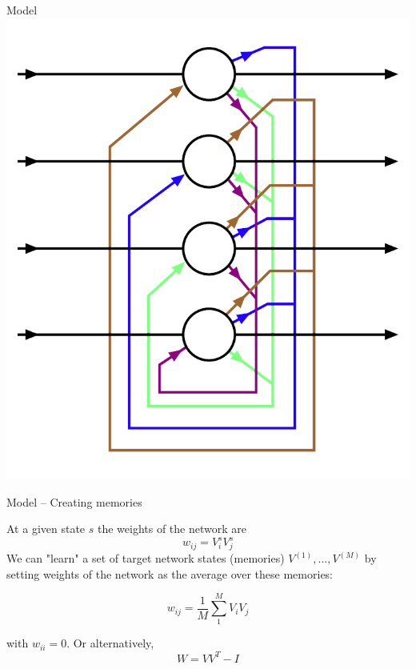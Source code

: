 \documentclass[10pt]{beamer}
\begin{document}
\begin{frame}{Model}	
	\centering
	\includegraphics[width=0.8\textheight]{"../img/hopfieldnet.png"}
\end{frame}

\begin{frame}{Model -- Creating memories}	

	At a given state $s$ the weights of the network are 
	\begin{equation}
		w_{ij} = V^s_i V^s_j
	\end{equation}
	We can "learn" a set of target network states (memories) $ V^{(1)}, ..., V^{(M)}$ by setting weights of the network as the average over these memories:
	
		
	\begin{equation}
		w_{ij} = \frac{1}{M} \sum^{M}_{1} V_i V_j
	\end{equation}

	with $w_{ii} = 0$. Or alternatively,
	\begin{equation}
	W = VV^T - I
	\end{equation}


%			
\end{frame}
\end{document}
